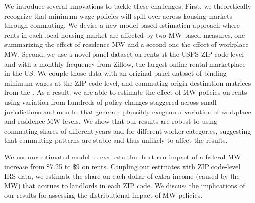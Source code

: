 
We introduce several innovations to tackle these challenges.
First, we theoretically recognize that minimum wage policies will spill over 
across housing markets through commuting.
We devise a new model-based estimation approach where rents in each local 
housing market are affected by two MW-based measures, one summarizing the 
effect of residence MW and a second one the effect of workplace MW.
Second, we use a novel panel dataset on rents at the USPS ZIP code level and with 
a monthly frequency from Zillow, the largest online rental marketplace in the US.
We couple those data with an original panel dataset of binding minimum wages 
at the ZIP code level, and commuting origin-destination matrices from 
the \textcite{CensusLODES}.
As a result, we are able to estimate the effect of MW policies on rents using 
variation from hundreds of policy changes staggered across small jurisdictions 
and months that generate plausibly exogenous variation of workplace and 
residence MW levels.
We show that our results are robust to using commuting shares of different years
and for different worker categories, suggesting that commuting patterns are 
stable and thus unlikely to affect the results.

We use our estimated model to evaluate the short-run impact of a federal MW 
increase from \$7.25 to \$9 on rents.
Coupling our estimates with ZIP code-level IRS data, we estimate the share on 
each dollar of extra income (caused by the MW) that accrues to landlords in each 
ZIP code.
We discuss the implications of our results for assessing the distributional 
impact of MW policies.


